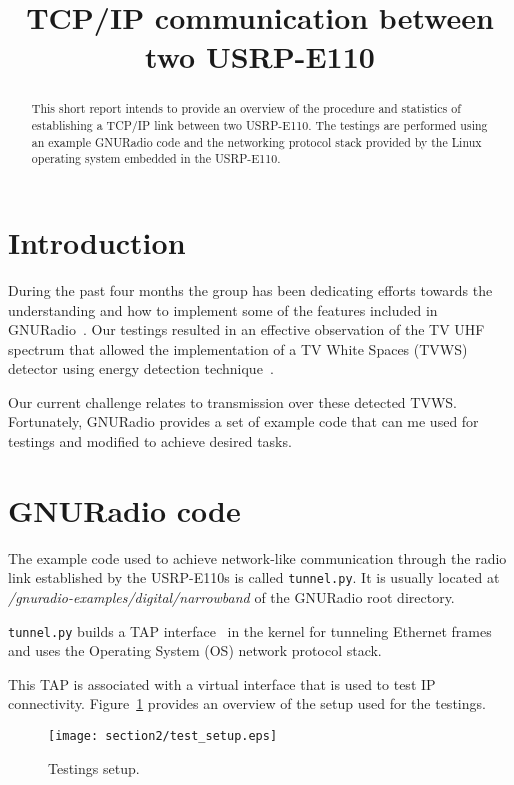 \documentclass[a4paper,journal]{IEEEtran}
\title{TCP/IP communication between two USRP-E110}
\author{
     \IEEEauthorblockN{Luis Sanabria-Russo\\
     \IEEEauthorblockA{Technical Report
     \\luis.sanabria@upf.edu}}
 }
\begin{document}
\maketitle

\begin{abstract}
This short report intends to provide an overview of the procedure and statistics of establishing a TCP/IP link between two USRP-E110. The testings are performed using an example GNURadio code and the networking protocol stack provided by the Linux operating system embedded in the USRP-E110.
\end{abstract}


\section{Introduction}
  During the past four months the group has been dedicating efforts towards the understanding and how to implement some of the features included in GNURadio~\cite{GNURadio}. Our testings resulted in an effective observation of the TV UHF spectrum that allowed the implementation of a TV White Spaces (TVWS) detector using energy detection technique~\cite{spec_sensing, energyDetection}.

Our current challenge relates to transmission over these detected TVWS. Fortunately, GNURadio provides a set of example code that can me used for testings and modified to achieve desired tasks.   
\section{GNURadio code}
  The example code used to achieve network-like communication through the radio link established by the USRP-E110s is called \verb|tunnel.py|. It is usually located at \emph{/gnuradio-examples/digital/narrowband} of the GNURadio root directory.

\verb|tunnel.py| builds a TAP interface~\cite{TAP} in the kernel for tunneling Ethernet frames and uses the Operating System (OS) network protocol stack.

This TAP is associated with a virtual interface that is used to test IP connectivity. Figure~\ref{setup} provides an overview of the setup used for the testings.

\begin{figure}[htbp]
  \centering
  \texttt{[image: section2/test\_setup.eps]}
  \caption{Testings setup.}
  \label{setup}
\end{figure}
\end{document}
